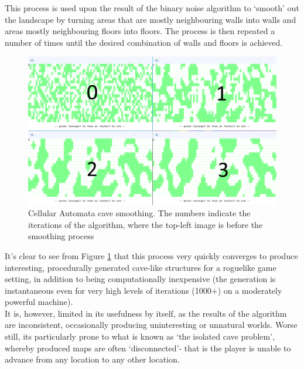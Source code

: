 \documentclass[12pt,a4paper]{article}
\begin{document}
This process is used upon the result of the binary noise algorithm to `smooth' out the landscape by turning areas that are mostly neighbouring walls into walls and areas mostly neighbouring floors into floors. The process is then repeated a number of times until the desired combination of walls and floors is achieved. \\


\begin{figure}[h]
  \centering
 	\includegraphics[scale=0.5]{images/cellauto.png}
	\caption[]{Cellular Automata cave smoothing. The numbers indicate the iterations of the algorithm, where the top-left image is before the smoothing process}
	\label{fig:fig3}
\end{figure}

It's clear to see from Figure \ref{fig:fig3} that this process very quickly converges to produce interesting, procedurally generated cave-like structures for a roguelike game setting, in addition to being computationally inexpensive (the generation is instantaneous even for very high levels of iterations (1000+) on a moderately powerful machine). \\

It is, however, limited in its usefulness by itself, as the results of the algorithm are inconsistent, occasionally producing uninteresting or unnatural worlds. Worse still, its particularly prone to what is known as `the isolated cave problem', whereby produced maps are often `disconnected'- that is the player is unable to advance from any location to any other location. \\
\end{document}
